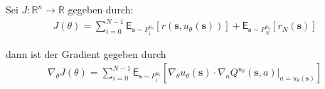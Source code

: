 \documentclass[a4paper, 12pt]{scrartcl}
\begin{document}
\begin{satz}\label{DPG}
    Sei $J:\mathbb{R}^{n} \to \mathbb{R}$ gegeben durch:
    \begin{align*}
        J(\theta) 
        =
        \sum_{i=0}^{N-1} 
        \mathsf{E}_{\bm{s} \sim P_i^{u_\theta}} 
        \left[
            r(\bm{s}, u_\theta (\bm{s}))
        \right]
        +
        \mathsf{E}_{\bm{s} \sim P_N^{u_\theta}} 
        \left[
            r_N(\bm{s})
        \right]
    \end{align*}

    dann ist der Gradient gegeben durch 
    \begin{align*}
        \nabla_\theta J(\theta) 
        =
        \sum_{i=0}^{N-1}
        \mathsf{E}_{\bm{s} \sim P_i^{u_\theta}}
        \left[
            \nabla_{\theta} u_\theta (\bm{s}) \cdot 
            \nabla_a Q^{u_{\theta}}(\bm{s}, a) \Big|_{a = u_\theta (\bm{s})}
        \right]
    \end{align*}
\end{satz}
\end{document}

